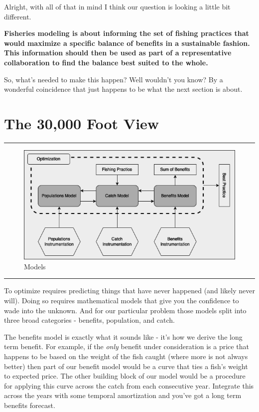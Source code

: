 \documentclass[11pt,a5paper]{book}
\begin{document}
Alright, with all of that in mind I think our question is looking a little bit different. 
\newline

 \hangindent=1cm \noindent \textbf{Fisheries modeling is about informing the set of fishing practices that would maximize a specific balance of benefits in a sustainable fashion. This information should then be used as part of a representative collaboration to find the balance best suited to the whole.}
\newline

So, what's needed to make this happen? Well wouldn't you know? By a wonderful coincidence that just happens to be what the next section is about. 
\newpage

\section{The 30,000 Foot View}

\noindent \rule{\textwidth}{0.5pt} 
\begin{figure}[h!] 
  \includegraphics[width=\linewidth]{drawings/high_level_models.png}
  \caption{Models}
  \label{fig:high_level_models}
\end{figure}
\newline
\rule{\textwidth}{0.5pt} 
\vspace{5pt}

To optimize requires predicting things that have never happened (and likely never will). Doing so requires mathematical models that give you the confidence to wade into the unknown. And for our particular problem those models split into three broad categories - benefits, population, and catch. 
\newline

The benefits model is exactly what it sounds like - it's how we derive the long term benefit. For example, if the \textit{only} benefit under consideration is a price that happens to be based on the weight of the fish caught (where more is not always better) then part of our benefit model would be a curve that ties a fish's weight to expected price. The other building block of our model would be a procedure for applying this curve across the catch from each consecutive year. Integrate this across the years with some temporal amortization and you've got a long term benefits forecast. 
\newline
\end{document}
